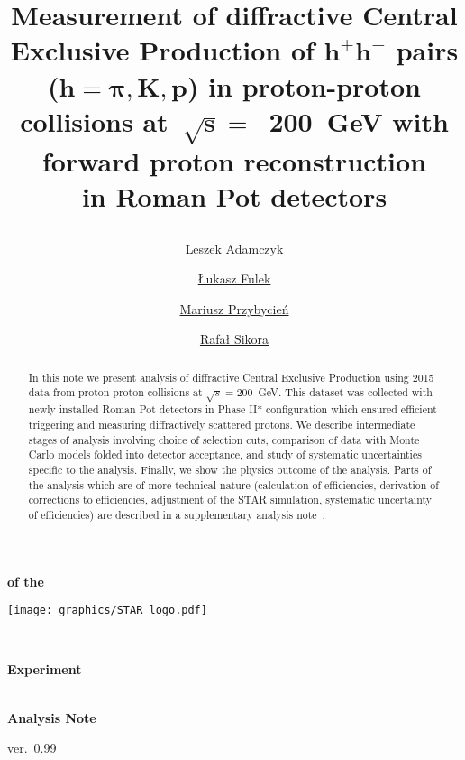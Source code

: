 \documentclass[a4paper,10pt,notitlepage]{report}
\title{%
\centering\hspace*{-0.08\linewidth}\begin{minipage}{1.16\linewidth}\centering%
\textbf{Measurement of diffractive Central Exclusive Production of $\bm{h^{+}h^{-}}$ pairs ($\bm{h=\pi,K,p}$) in proton-proton collisions at~$\bm{\sqrt{s}=}$~200~GeV with forward proton reconstruction\\in Roman Pot detectors}
\end{minipage}%
\vspace*{10pt}}
\author[ ]{\href{mailto:leszek.adamczyk@agh.edu.pl}{Leszek Adamczyk}}
\author[ ]{\href{mailto:lukasz.fulek@fis.agh.edu.pl}{Łukasz Fulek}}
\author[ ]{\href{mailto:mariusz.przybycien@agh.edu.pl}{Mariusz Przybycień}}
\author[ ]{\href{mailto:rafal.sikora@fis.agh.edu.pl}{Rafał Sikora}}
\affil[ ]{AGH University of Science and Technology, FPACS, Kraków, Poland}
\begin{document}
\begin{center}
\begin{minipage}[c]{0.12\linewidth}%
\vspace{5.5pt}\textbf{\LARGE{of the}}
\end{minipage}
\begin{minipage}[c]{0.15\linewidth}%
\hspace*{-8pt}\texttt{[image: graphics/STAR\_logo.pdf]}
\end{minipage}~
\begin{minipage}[c]{0.24\linewidth}%
\vspace{9pt}\hspace*{-8pt}\textbf{\LARGE{Experiment}}
\end{minipage}\\[-50pt]
\textbf{\LARGE{Analysis Note}}

\vspace*{150pt}
\begin{minipage}{\linewidth}
\maketitle
\begin{abstract}
In this note we present analysis of diffractive Central Exclusive Production using 2015 data from proton-proton collisions at $\sqrt{s}=200$~GeV. This dataset was collected with newly installed Roman Pot detectors in Phase II* configuration which ensured efficient triggering and measuring diffractively scattered protons. We describe intermediate stages of analysis involving choice of selection cuts, comparison of data with Monte Carlo models folded into detector acceptance, and study of systematic uncertainties specific to the analysis. Finally, we show the physics outcome of the analysis. Parts of the analysis which are of more technical nature (calculation of efficiencies, derivation of corrections to efficiencies, adjustment of the STAR simulation, systematic uncertainty of efficiencies) are described in a supplementary analysis note~\cite{supplementaryNote}.
\end{abstract}
\thispagestyle{empty}
\end{minipage}

\vspace{50pt}

ver.~0.99
\end{center}


\clearpage
\thispagestyle{empty}
\end{document}
